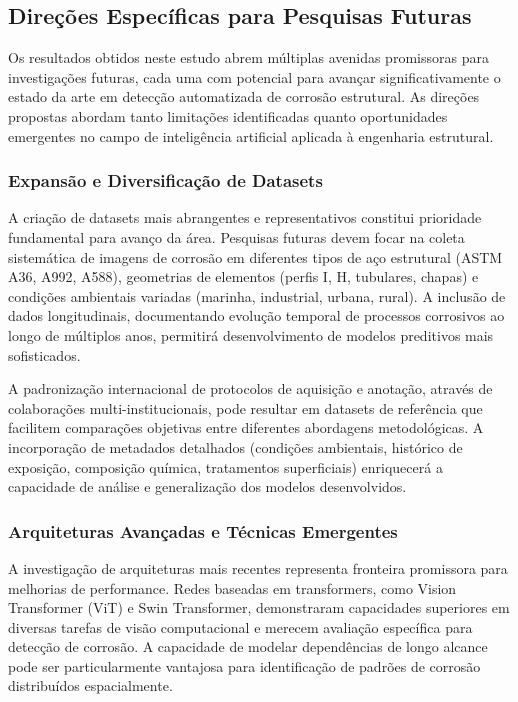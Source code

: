 \documentclass[12pt,a4paper,twoside]{article}
\begin{document}
\subsection{Direções Específicas para Pesquisas Futuras}
\label{subsec:trabalhos_futuros}

Os resultados obtidos neste estudo abrem múltiplas avenidas promissoras para investigações futuras, cada uma com potencial para avançar significativamente o estado da arte em detecção automatizada de corrosão estrutural. As direções propostas abordam tanto limitações identificadas quanto oportunidades emergentes no campo de inteligência artificial aplicada à engenharia estrutural.

\subsubsection{Expansão e Diversificação de Datasets}

A criação de datasets mais abrangentes e representativos constitui prioridade fundamental para avanço da área. Pesquisas futuras devem focar na coleta sistemática de imagens de corrosão em diferentes tipos de aço estrutural (ASTM A36, A992, A588), geometrias de elementos (perfis I, H, tubulares, chapas) e condições ambientais variadas (marinha, industrial, urbana, rural). A inclusão de dados longitudinais, documentando evolução temporal de processos corrosivos ao longo de múltiplos anos, permitirá desenvolvimento de modelos preditivos mais sofisticados.

A padronização internacional de protocolos de aquisição e anotação, através de colaborações multi-institucionais, pode resultar em datasets de referência que facilitem comparações objetivas entre diferentes abordagens metodológicas. A incorporação de metadados detalhados (condições ambientais, histórico de exposição, composição química, tratamentos superficiais) enriquecerá a capacidade de análise e generalização dos modelos desenvolvidos.

\subsubsection{Arquiteturas Avançadas e Técnicas Emergentes}

A investigação de arquiteturas mais recentes representa fronteira promissora para melhorias de performance. Redes baseadas em transformers, como Vision Transformer (ViT) e Swin Transformer, demonstraram capacidades superiores em diversas tarefas de visão computacional e merecem avaliação específica para detecção de corrosão. A capacidade de modelar dependências de longo alcance pode ser particularmente vantajosa para identificação de padrões de corrosão distribuídos espacialmente.
\end{document}

